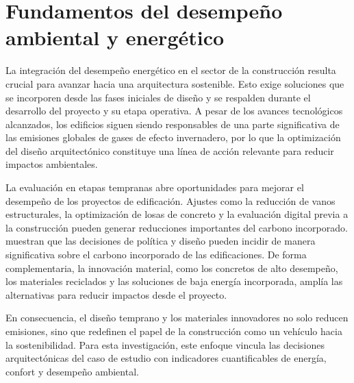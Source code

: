 
\section{Fundamentos del desempeño ambiental y energético}

\begin{textoDosTercios}

La integración del desempeño energético en el sector de la construcción resulta crucial para avanzar hacia una arquitectura sostenible. Esto exige soluciones que se incorporen desde las fases iniciales de diseño y se respalden durante el desarrollo del proyecto y su etapa operativa. A pesar de los avances tecnológicos alcanzados, los edificios siguen siendo responsables de una parte significativa de las emisiones globales de gases de efecto invernadero, por lo que la optimización del diseño arquitectónico constituye una línea de acción relevante para reducir impactos ambientales.

La evaluación en etapas tempranas abre oportunidades para mejorar el desempeño de los proyectos de edificación. Ajustes como la reducción de vanos estructurales, la optimización de losas de concreto y la evaluación digital previa a la construcción pueden generar reducciones importantes del carbono incorporado. \textcite{feickertPolicyDesignLevers2025} muestran que las decisiones de política y diseño pueden incidir de manera significativa sobre el carbono incorporado de las edificaciones. De forma complementaria, la innovación material, como los concretos de alto desempeño, los materiales reciclados y las soluciones de baja energía incorporada, amplía las alternativas para reducir impactos desde el proyecto.

En consecuencia, el diseño temprano y los materiales innovadores no solo reducen emisiones, sino que redefinen el papel de la construcción como un vehículo hacia la sostenibilidad. Para esta investigación, este enfoque vincula las decisiones arquitectónicas del caso de estudio con indicadores cuantificables de energía, confort y desempeño ambiental.

\end{textoDosTercios}


